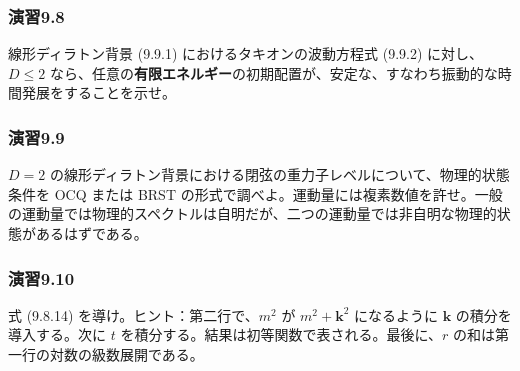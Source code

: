 \subsubsection*{演習9.8}\label{ex:9.8}
線形ディラトン背景 (9.9.1) におけるタキオンの波動方程式 (9.9.2) に対し、$D\leq2$ なら、任意の\textbf{有限エネルギー}の初期配置が、安定な、すなわち振動的な時間発展をすることを示せ。

\subsubsection*{演習9.9}\label{ex:9.9}
$D=2$ の線形ディラトン背景における閉弦の重力子レベルについて、物理的状態条件を OCQ または BRST の形式で調べよ。運動量には複素数値を許せ。一般の運動量では物理的スペクトルは自明だが、二つの運動量では非自明な物理的状態があるはずである。

\subsubsection*{演習9.10}\label{ex:9.10}
式 (9.8.14) を導け。ヒント：第二行で、$m^2$ が $m^2+\boldsymbol k^2$ になるように $\boldsymbol k$ の積分を導入する。次に $t$ を積分する。結果は初等関数で表される。最後に、$r$ の和は第一行の対数の級数展開である。
